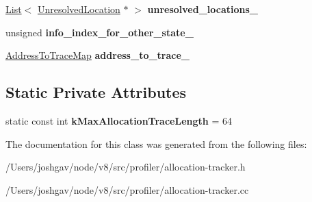 \begin{DoxyCompactItemize}
\item 
\hyperlink{classv8_1_1internal_1_1_list}{List}$<$ \hyperlink{classv8_1_1internal_1_1_allocation_tracker_1_1_unresolved_location}{Unresolved\+Location} $\ast$ $>$ {\bfseries unresolved\+\_\+locations\+\_\+}\hypertarget{classv8_1_1internal_1_1_allocation_tracker_aa3e21b01c4eb5ac83edb180ef9e269bb}{}\label{classv8_1_1internal_1_1_allocation_tracker_aa3e21b01c4eb5ac83edb180ef9e269bb}

\item 
unsigned {\bfseries info\+\_\+index\+\_\+for\+\_\+other\+\_\+state\+\_\+}\hypertarget{classv8_1_1internal_1_1_allocation_tracker_a11021be4a0873ee3ea9ead9e081e48b7}{}\label{classv8_1_1internal_1_1_allocation_tracker_a11021be4a0873ee3ea9ead9e081e48b7}

\item 
\hyperlink{classv8_1_1internal_1_1_address_to_trace_map}{Address\+To\+Trace\+Map} {\bfseries address\+\_\+to\+\_\+trace\+\_\+}\hypertarget{classv8_1_1internal_1_1_allocation_tracker_a3e196ef67967218217b9d2c5131fa7c1}{}\label{classv8_1_1internal_1_1_allocation_tracker_a3e196ef67967218217b9d2c5131fa7c1}

\end{DoxyCompactItemize}
\subsection*{Static Private Attributes}
\begin{DoxyCompactItemize}
\item 
static const int {\bfseries k\+Max\+Allocation\+Trace\+Length} = 64\hypertarget{classv8_1_1internal_1_1_allocation_tracker_ac8b14ca549f6776ca3a67585a56ba805}{}\label{classv8_1_1internal_1_1_allocation_tracker_ac8b14ca549f6776ca3a67585a56ba805}

\end{DoxyCompactItemize}


The documentation for this class was generated from the following files\+:\begin{DoxyCompactItemize}
\item 
/\+Users/joshgav/node/v8/src/profiler/allocation-\/tracker.\+h\item 
/\+Users/joshgav/node/v8/src/profiler/allocation-\/tracker.\+cc\end{DoxyCompactItemize}

